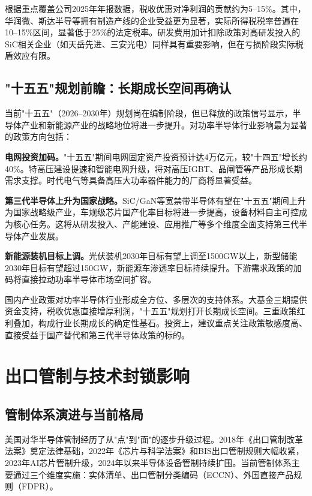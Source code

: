 根据重点覆盖公司2025年年报数据，税收优惠对净利润的贡献约为5--15\%。其中，华润微、斯达半导等拥有制造产线的企业受益更为显著，实际所得税税率普遍在10--15\%区间，显著低于25\%的法定税率。研发费用加计扣除政策对高研发投入的SiC相关企业（如天岳先进、三安光电）同样具有重要影响，但在亏损阶段实际税盾效应有限。

\subsection{"十五五"规划前瞻：长期成长空间再确认}

当前"十五五"（2026--2030年）规划尚在编制阶段，但已释放的政策信号显示，半导体产业和新能源产业的战略地位将进一步提升。对功率半导体行业影响最为显著的政策方向包括：

\textbf{电网投资加码。}"十五五"期间电网固定资产投资预计达4万亿元，较"十四五"增长约40\%。特高压建设提速和智能电网升级，将对高压IGBT、晶闸管等产品形成长期需求支撑。时代电气等具备高压大功率器件能力的厂商将显著受益。

\textbf{第三代半导体上升为国家战略。}SiC/GaN等宽禁带半导体有望在"十五五"期间上升为国家战略级产业，车规级芯片国产化率目标将进一步提高，设备材料自主可控成为核心任务。这将从研发投入、产能建设、应用推广等多个维度全面支持第三代半导体产业发展。

\textbf{新能源装机目标上调。}光伏装机2030年目标有望上调至1500GW以上，新型储能2030年目标有望超过150GW，新能源车渗透率目标持续提升。下游需求政策的加码将直接拉动功率半导体市场空间扩容。

\begin{keyinsight}[国内政策环境评估]
国内产业政策对功率半导体行业形成全方位、多层次的支持体系。大基金三期提供资金支持，税收优惠直接增厚利润，"十五五"规划打开长期成长空间。三重政策红利叠加，构成行业长期成长的确定性基石。投资上，建议重点关注政策敏感度高、直接受益于国产替代和第三代半导体政策的标的。
\end{keyinsight}

\section{出口管制与技术封锁影响}

\subsection{管制体系演进与当前格局}

美国对华半导体管制经历了从"点"到"面"的逐步升级过程。2018年《出口管制改革法案》奠定法律基础，2022年《芯片与科学法案》和BIS出口管制规则大幅收紧，2023年AI芯片管制升级，2024年以来半导体设备管制持续扩围。当前管制体系主要通过三个维度实施：实体清单、出口管制分类编码（ECCN）、外国直接产品规则（FDPR）。

